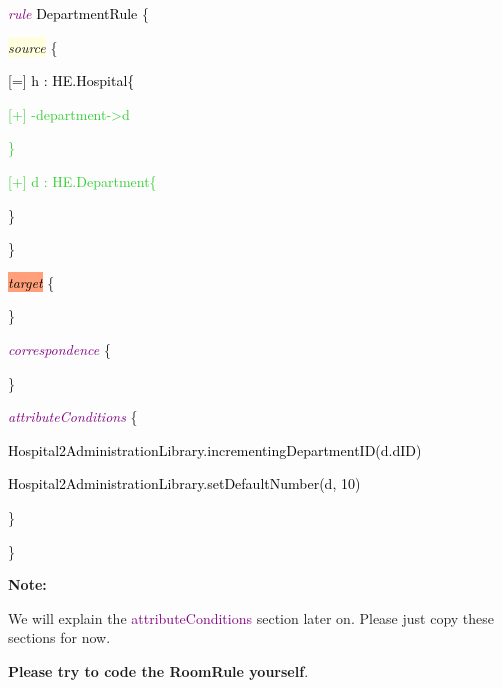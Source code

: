 {
	
	\hspace{0.5cm}\textcolor{Purple}{\textit{rule}} \textcolor{black}{DepartmentRule} \{
	
	\hspace{0.5cm}\colorbox{LightYellow}{\textit{source}} \{ 
	
	\hspace{1cm}\textcolor{black}{[=] h : HE.Hospital\{}
	
	\hspace{1.5cm}\textcolor{LimeGreen}{[+] -department->d}
	
	\hspace{1cm}\textcolor{LimeGreen}{\}}
	
	\hspace{1cm}\textcolor{LimeGreen}{[+] d : HE.Department\{}
	
	\hspace{1cm}\}
	
	\hspace{0.5cm}\}
	
	\hspace{0.5cm}\textcolor{black}{\colorbox{LightSalmon}{\textit{target}}} \{
	
	\hspace{0.5cm}\}
	
	\hspace{0.5cm}\textcolor{Purple}{\textit{correspondence}} \{
	
	\hspace{0.5cm}\}
	
	\hspace{0.5cm}\textcolor{Purple}{\textit{attributeConditions}} \{
	
	\hspace{1cm}\textcolor{black}{Hospital2AdministrationLibrary.incrementingDepartmentID(d.dID)}
	
	\hspace{1cm}\textcolor{black}{Hospital2AdministrationLibrary.setDefaultNumber(d, 10)}
	
	\hspace{0.5cm}\}
	
	\}





\textbf{Note:}

We will explain the \textcolor{Purple}{attributeConditions} section later on. Please just copy these sections for now.\newline

\textbf{Please try to code the \textsf{RoomRule} yourself}.\newline

}
